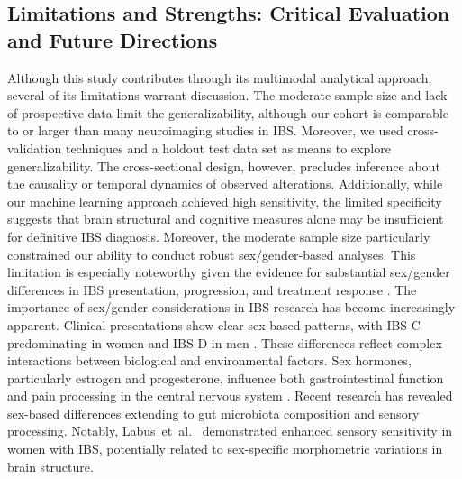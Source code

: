 \documentclass[diagnostics,article,accept,pdftex,moreauthors]{Definitions/mdpi}
\begin{document}
\subsection{Limitations and Strengths: Critical Evaluation and Future Directions}
Although this study contributes through its multimodal analytical approach, several of its limitations warrant discussion. {The moderate sample size and lack of prospective data limit the generalizability, although our cohort is comparable to or larger than many neuroimaging studies in IBS. Moreover, we used cross-validation techniques and a holdout test data set as means to explore generalizability.} The cross-sectional design, however, precludes inference about the causality or temporal dynamics of observed alterations. Additionally, while our machine learning approach achieved high sensitivity, the limited specificity suggests that brain structural and cognitive measures alone may be insufficient for definitive IBS diagnosis. Moreover, the moderate sample size particularly constrained our ability to conduct robust sex/gender-based analyses. This limitation is especially noteworthy given the evidence for substantial sex/gender differences in IBS presentation, progression, and treatment response \cite{van2021sex}. The importance of sex/gender considerations in IBS research has become increasingly apparent. Clinical presentations show clear sex-based patterns, with IBS-C predominating in women and IBS-D in men \cite{lee2001gender}. These differences reflect complex interactions between biological and environmental factors. Sex hormones, particularly estrogen and progesterone, influence both gastrointestinal function and pain processing in the central nervous system \cite{chang2002gender}. Recent research has revealed sex-based differences extending to gut microbiota composition \cite{vemuri2019microgenderome} and sensory processing. Notably, \mbox{Labus et al. \cite{labus2023sex}} demonstrated enhanced sensory sensitivity in women with IBS, potentially related to sex-specific morphometric variations in brain structure.
\end{document}
